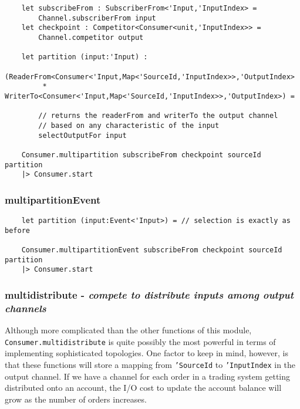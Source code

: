 \documentclass{article}
\begin{document}
\begin{verbatim}
    let subscribeFrom : SubscriberFrom<'Input,'InputIndex> =
        Channel.subscriberFrom input
    let checkpoint : Competitor<Consumer<unit,'InputIndex>> =
        Channel.competitor output
    
    let partition (input:'Input) :
        (ReaderFrom<Consumer<'Input,Map<'SourceId,'InputIndex>>,'OutputIndex>
         * WriterTo<Consumer<'Input,Map<'SourceId,'InputIndex>>,'OutputIndex>) =
        
        // returns the readerFrom and writerTo the output channel
        // based on any characteristic of the input
        selectOutputFor input
        
    Consumer.multipartition subscribeFrom checkpoint sourceId partition
    |> Consumer.start
\end{verbatim}

\subsubsection{multipartitionEvent}

\begin{verbatim}
    let partition (input:Event<'Input>) = // selection is exactly as before
    
    Consumer.multipartitionEvent subscribeFrom checkpoint sourceId partition
    |> Consumer.start
\end{verbatim}

\subsubsection{multidistribute - \textit{compete to distribute inputs among output channels}}

Although more complicated than the other functions of this module, \texttt{Consumer.multidistribute} is quite possibly the most powerful in terms of implementing sophisticated topologies.  One factor to keep in mind, however, is that these functions will store a mapping from \texttt{'SourceId} to \texttt{'InputIndex} in the output channel. If we have a channel for each order in a trading system getting distributed onto an account, the I/O cost to update the account balance will grow as the number of orders increases.
\end{document}
